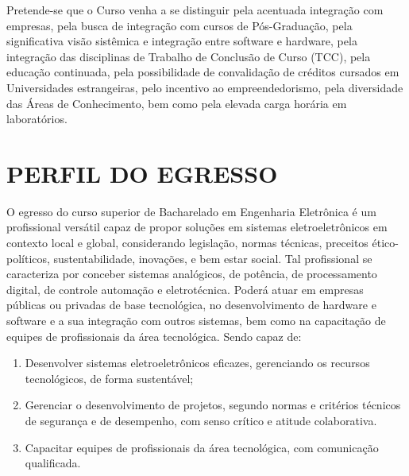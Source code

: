 Pretende-se que o Curso venha a se distinguir pela acentuada integração com empresas, pela busca de integração com cursos de Pós-Graduação, pela significativa visão sistêmica e integração entre software e hardware, pela integração das disciplinas de Trabalho de Conclusão de Curso (TCC), pela educação continuada, pela possibilidade de convalidação de créditos cursados em Universidades estrangeiras, pelo incentivo ao empreendedorismo, pela diversidade das Áreas de Conhecimento, bem como pela elevada carga horária em laboratórios.

\section{PERFIL DO EGRESSO}
\label{sec:perf}

O egresso do curso superior de Bacharelado em Engenharia Eletrônica é um profissional versátil capaz de propor soluções em sistemas eletroeletrônicos em contexto local e global, considerando legislação, normas técnicas, preceitos ético-políticos, sustentabilidade, inovações, e bem estar social. Tal profissional se caracteriza por conceber sistemas analógicos, de potência, de processamento digital, de controle automação e eletrotécnica. Poderá atuar em empresas públicas ou privadas de base tecnológica, no desenvolvimento de hardware e software e a sua integração com outros sistemas, bem como na capacitação de equipes de profissionais da área tecnológica. Sendo capaz de:


\renewcommand{\labelenumi}{\roman{enumi}}
\begin{enumerate}
	\item Desenvolver sistemas eletroeletrônicos eficazes, gerenciando os recursos tecnológicos, de forma sustentável; 
	\item Gerenciar o desenvolvimento de projetos, segundo normas e critérios técnicos de segurança e de desempenho, com senso crítico e atitude colaborativa. 
	\item Capacitar equipes de profissionais da área tecnológica, com comunicação qualificada.
\end{enumerate} 
 

